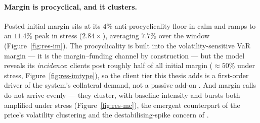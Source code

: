 






\paragraph{Margin is procyclical, and it clusters.}
Posted initial margin sits at its $4\%$ anti-procyclicality floor in calm and ramps to an $11.4\%$ peak
in stress ($2.84\times$), averaging $7.7\%$ over the window (Figure~\ref{fig:res-im}). The
procyclicality is built into the volatility-sensitive VaR margin --- it is the
\citet{brunnermeier_pedersen_2009} margin--funding channel by construction --- but the model reveals its
\emph{incidence}: clients post roughly half of all initial margin (${\approx}50\%$ under stress,
Figure~\ref{fig:res-imtype}), so the client tier this thesis adds is a first-order driver of the
system's collateral demand, not a passive add-on \citep{menkveld_vuillemey_2021}. And margin calls do
not arrive evenly --- they cluster, with baseline intensity and bursts both amplified under stress
(Figure~\ref{fig:res-mc}), the emergent counterpart of the price's volatility clustering and the
destabilising-spike concern of \citet{glasserman_wu_2018}.





